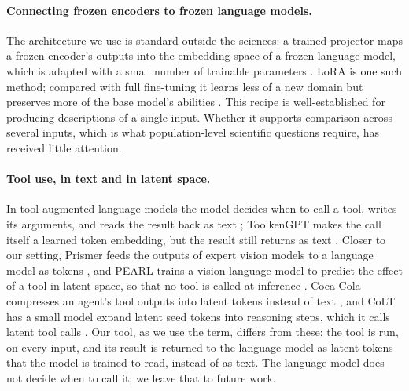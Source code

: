 \paragraph{Connecting frozen encoders to frozen language models.}
The architecture we use is standard outside the sciences: a trained projector maps a
frozen encoder's outputs into the embedding space of a frozen language model, which is
adapted with a small number of trainable parameters \citep{Tsimpoukelli2021_frozen,
Alayrac2022_flamingo, Li2023_blip2, Liu2023_llava}. LoRA \citep{Hu2021_lora} is one such method; compared with full fine-tuning it learns less of a new domain but preserves more of the base model's abilities \citep{Biderman2024_lora}. This recipe is
well-established for producing descriptions of a single input. Whether it supports
comparison across several inputs, which is what population-level scientific questions
require, has received little attention.

\paragraph{Tool use, in text and in latent space.}
In tool-augmented language models the model decides when to call a tool, writes its
arguments, and reads the result back as text \citep{Schick2023_toolformer, Gao2023_pal};
ToolkenGPT makes the call itself a learned token embedding, but the result still returns
as text \citep{Hao2023ToolkenGPTAF}. Closer to our setting, Prismer feeds the outputs of
expert vision models to a language model as tokens \citep{Liu2023_prismer}, and PEARL
trains a vision-language model to predict the effect of a tool in latent space, so that no
tool is called at inference \citep{Adhikari2026_pearl}. Coca-Cola compresses an agent's tool outputs into latent tokens instead of text \citep{Liu2026_cocacola}, and CoLT has a small model expand latent seed tokens into reasoning steps, which it calls latent tool calls \citep{Zhu2026_colt}. Our tool, as we use the
term, differs from these: the tool is run, on every input, and its result is returned to the
language model as latent tokens that the model is trained to read, instead of as text. The
language model does not decide when to call it; we leave that to future work.

